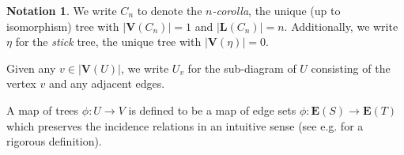 \documentclass[a4paper,10pt
,draft
]{article}%
\numberwithin{equation}{section}
\numberwithin{figure}{section}
\theoremstyle{definition} %
\newtheorem{notation}[equation]{Notation}%
\newcommand{\set}[1]{\left\{#1\right\}}%
\newcommand{\1}{\ensuremath{\mathbbm 1}}%
\begin{document}
\begin{notation}
      We write $C_n$ to denote the \textit{$n$-corolla}, the unique (up to isomorphism) tree with
      $|\boldsymbol{V}(C_n)| = 1$ and $|\boldsymbol{L}(C_n)|=n$.
      Additionally, we write $\eta$ for the \textit{stick} tree, the unique tree with $|\boldsymbol{V}(\eta)| = 0$.

      Given any $v \in |\boldsymbol{V}(U)|$, we write $U_v$ for the sub-diagram of $U$
      consisting of the vertex $v$ and any adjacent edges.
\end{notation}


A map of trees $\phi \colon U \to V$ is defined to be
a map of edge sets $\phi \colon \boldsymbol{E}(S) \to \boldsymbol{E}(T)$
which preserves the incidence relations in an intuitive sense
(see e.g. \cite[\S 2.1]{BP_edss} for a rigorous definition).
\end{document}
